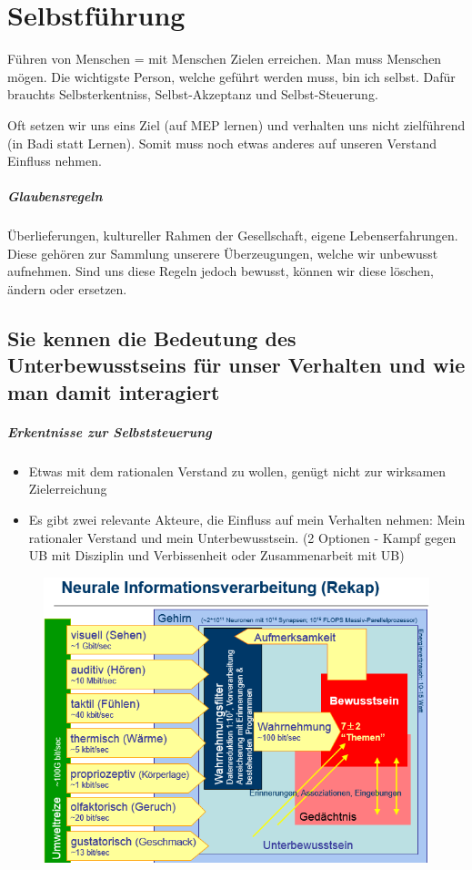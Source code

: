 \chapter{Selbstführung}
Führen von Menschen = mit Menschen Zielen erreichen. Man muss Menschen mögen. Die wichtigste Person, welche geführt werden muss, bin ich selbst. Dafür brauchts Selbsterkentniss, Selbst-Akzeptanz und Selbst-Steuerung.

Oft setzen wir uns eins Ziel (auf MEP lernen) und verhalten uns nicht zielführend (in Badi statt Lernen). Somit muss noch etwas anderes auf unseren Verstand Einfluss nehmen. 

\paragraph{Glaubensregeln}
Überlieferungen, kultureller Rahmen der Gesellschaft, eigene Lebenserfahrungen. Diese gehören zur Sammlung unserere Überzeugungen, welche wir unbewusst aufnehmen. Sind uns diese Regeln jedoch bewusst, können wir diese löschen, ändern oder ersetzen.

\section{Sie kennen die Bedeutung des Unterbewusstseins für unser Verhalten und wie man damit interagiert}

\paragraph{Erkentnisse zur Selbststeuerung}
\begin{itemize}
	\item Etwas mit dem rationalen Verstand zu wollen, genügt nicht zur wirksamen Zielerreichung
	\item Es gibt zwei relevante Akteure, die Einfluss auf mein Verhalten nehmen: Mein rationaler Verstand und mein Unterbewusstsein. (2 Optionen - Kampf gegen UB mit Disziplin und Verbissenheit oder Zusammenarbeit mit UB)
\end{itemize}

\begin{figure}[h!]
	\centering
	\includegraphics[width=0.7\linewidth]{fig/neurale-informationverarbeitung}
	\caption{}
	\label{fig:neurale-informationverarbeitung}
\end{figure}

